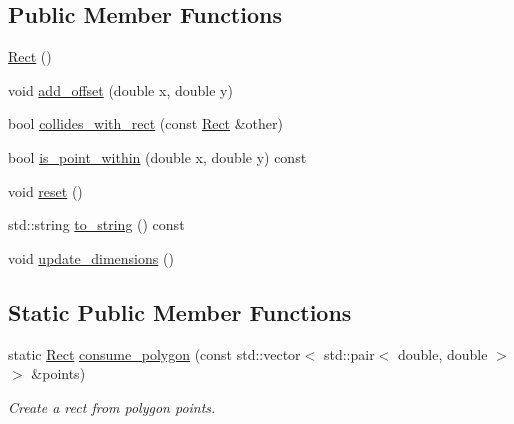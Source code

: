 \subsection*{Public Member Functions}
\begin{DoxyCompactItemize}
\item 
\hyperlink{classAsteroids_1_1Domain_1_1Game_1_1Actors_1_1Rect_a4e018b8938b343f70672695b58e5fa96}{Rect} ()
\item 
void \hyperlink{classAsteroids_1_1Domain_1_1Game_1_1Actors_1_1Rect_a0ab06f4fe6e0dbd681c89397f22aa08f}{add\+\_\+offset} (double x, double y)
\item 
bool \hyperlink{classAsteroids_1_1Domain_1_1Game_1_1Actors_1_1Rect_acc14c3d293e2bfd3b55aa6e727457bf0}{collides\+\_\+with\+\_\+rect} (const \hyperlink{classAsteroids_1_1Domain_1_1Game_1_1Actors_1_1Rect}{Rect} \&other)
\item 
bool \hyperlink{classAsteroids_1_1Domain_1_1Game_1_1Actors_1_1Rect_a9e3bfefa639425d77c9f417061b4867e}{is\+\_\+point\+\_\+within} (double x, double y) const
\item 
void \hyperlink{classAsteroids_1_1Domain_1_1Game_1_1Actors_1_1Rect_a065181734dd1fd44e698ef52a6a265b1}{reset} ()
\item 
std\+::string \hyperlink{classAsteroids_1_1Domain_1_1Game_1_1Actors_1_1Rect_a9b519e84380246e4836c6c0a925cfa89}{to\+\_\+string} () const
\item 
void \hyperlink{classAsteroids_1_1Domain_1_1Game_1_1Actors_1_1Rect_a40c593b8be9c243d6cdc30e2f8ee67df}{update\+\_\+dimensions} ()
\end{DoxyCompactItemize}
\subsection*{Static Public Member Functions}
\begin{DoxyCompactItemize}
\item 
static \hyperlink{classAsteroids_1_1Domain_1_1Game_1_1Actors_1_1Rect}{Rect} \hyperlink{classAsteroids_1_1Domain_1_1Game_1_1Actors_1_1Rect_a687d0848c13d1b8dfbd2f896636b4145}{consume\+\_\+polygon} (const std\+::vector$<$ std\+::pair$<$ double, double $>$$>$ \&points)
\begin{DoxyCompactList}\small\item\em Create a rect from polygon points. \end{DoxyCompactList}\end{DoxyCompactItemize}
